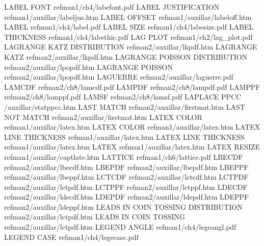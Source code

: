 LABEL FONT                              refman1/ch4/labefont.pdf
LABEL JUSTIFICATION                     refman1/auxillar/labeljus.htm
LABEL OFFSET                            refman1/auxillar/labeloff.htm
LABEL                                   refman1/ch4/label.pdf
LABEL SIZE                              refman1/ch4/labesize.pdf
LABEL THICKNESS                         refman1/ch4/labethic.pdf
LAG PLOT                                refman1/ch2/lag_plot.pdf
LAGRANGE KATZ DISTRIBUTION              refman2/auxillar/lkpdf.htm
LAGRANGE KATZ                           refman2/auxillar/lkpdf.htm
LAGRANGE POISSON DISTRIBUTION           refman2/auxillar/lpopdf.htm
LAGRANGE POISSON                        refman2/auxillar/lpopdf.htm
LAGUERRE                                refman2/auxillar/laguerre.pdf
LAMCDF                                  refman2/ch8/lamcdf.pdf
LAMPDF                                  refman2/ch8/lampdf.pdf
LAMPPF                                  refman2/ch8/lamppf.pdf
LAMSF                                   refman2/ch8/lamsf.pdf
LAPLACE PPCC                            /auxillar/statppcc.htm
LAST MATCH                              refman2/auxillar/firstmat.htm
LAST NOT MATCH                          refman2/auxillar/firstmat.htm
LATEX COLOR                             refman1/auxillar/latex.htm
LATEX COLOR                             refman1/auxillar/latex.htm
LATEX LINE THICKNESS                    refman1/auxillar/latex.htm
LATEX LINE THICKNESS                    refman1/auxillar/latex.htm
LATEX                                   refman1/auxillar/latex.htm
LATEX RESIZE                            refman1/auxillar/captlate.htm
LATTICE                                 refman1/ch6/lattice.pdf
LBECDF                                  refman2/auxillar/lbecdf.htm
LBEPDF                                  refman2/auxillar/lbepdf.htm
LBEPPF                                  refman2/auxillar/lbeppf.htm
LCTCDF                                  refman2/auxillar/lctcdf.htm
LCTPDF                                  refman2/auxillar/lctpdf.htm
LCTPPF                                  refman2/auxillar/lctppf.htm
LDECDF                                  refman2/auxillar/ldecdf.htm
LDEPDF                                  refman2/auxillar/ldepdf.htm
LDEPPF                                  refman2/auxillar/ldeppf.htm
LEADS IN COIN TOSSING DISTRIBUTION      refman2/auxillar/lctpdf.htm
LEADS IN COIN TOSSING                   refman2/auxillar/lctpdf.htm
LEGEND ANGLE                            refman1/ch4/legeangl.pdf
LEGEND CASE                             refman1/ch4/legecase.pdf
